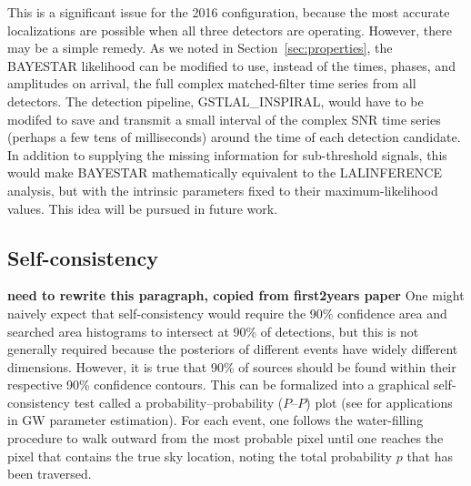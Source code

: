 \documentclass[amsmath,amssymb,aps,prx,reprint,nopreprintnumbers,nofootinbib]{revtex4-1}
\begin{document}
This is a significant issue for the 2016 configuration, because the most accurate localizations are possible when all three detectors are operating. However, there may be a simple remedy. As we noted in Section~\ref{sec:properties}, the \ac{BAYESTAR} likelihood can be modified to use, instead of the times, phases, and amplitudes on arrival, the full complex matched\nobreakdashes-filter time series from all detectors. The detection pipeline, GSTLAL\_INSPIRAL, would have to be modifed to save and transmit a small interval of the complex \ac{SNR} time series (perhaps a few tens of milliseconds) around the time of each detection candidate. In addition to supplying the missing information for sub\nobreakdashes-threshold signals, this would make \ac{BAYESTAR} mathematically equivalent to the LALINFERENCE analysis, but with the intrinsic parameters fixed to their maximum\nobreakdashes-likelihood values. This idea will be pursued in future work.

\subsection{Self-consistency}

\textbf{need to rewrite this paragraph, copied from first2years paper} One might naively expect that self\nobreakdashes-consistency would require the 90\% confidence area and searched area histograms to intersect at 90\% of detections, but this is not generally required because the posteriors of different events have widely different dimensions. However, it is true that 90\% of sources should be found within their respective 90\% confidence contours. This can be formalized into a graphical self\nobreakdashes-consistency test called a probability\nobreakdashes--probability ($P$\nobreakdashes--$P$) plot (see \citealt{SiderySkyLocalizationComparison} for applications in \ac{GW} parameter estimation). For each event, one follows the water\nobreakdashes-filling procedure to walk outward from the most probable pixel until one reaches the pixel that contains the true sky location, noting the total probability $p$ that has been traversed.
\end{document}
